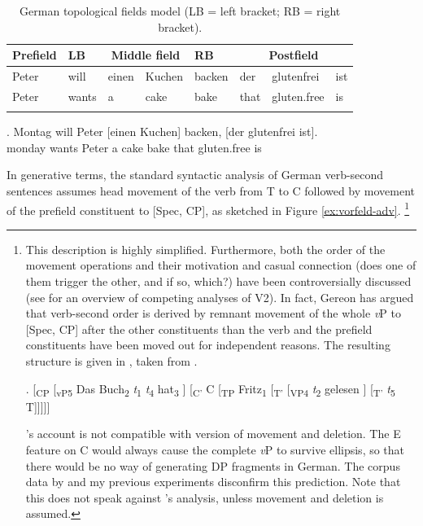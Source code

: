 \begin{table}[t]
\begin{tabular}{l l l l l l l l}
\lsptoprule
Prefield & LB & \multicolumn{2}{c}{Middle field} & RB & \multicolumn{3}{c}{Postfield}  \\   
\midrule
Peter & will & einen & Kuchen & backen & der & glutenfrei & ist\\
Peter & wants & a & cake & bake & that & gluten.free & is\\
\lspbottomrule
\end{tabular}
\caption{German topological fields model (LB = left bracket; RB = right bracket).\label{tab:feldermodell}}
\end{table}

\exg. Montag will Peter [einen Kuchen] backen, [der glutenfrei ist].\\
monday wants Peter a cake bake that gluten.free is\\

\newpage
\noindent In generative terms, the standard syntactic analysis of German verb-second sentences assumes head movement of the verb from T to C followed by movement of the prefield constituent to [Spec, CP], as sketched in Figure \ref{ex:vorfeld-adv}.\largerpage[2]%
%
\footnote{This description is highly simplified. Furthermore, both the order of the movement operations and their motivation and casual connection (does one of them trigger the other, and if so, which?) have been controversially discussed (see \citet{brandner2004} for an overview of competing analyses of V2). In fact, Gereon \citet{muller2004} has argued that verb-second order is derived by remnant movement of the whole \textit{v}P to [Spec, CP] after the other constituents than the verb and the prefield constituents have been moved out for independent reasons. The resulting structure is given in \Next, taken from \citep[181]{muller2004}.

\ex. [\textsubscript{CP} [\textsubscript{vP}\textsubscript{5} Das Buch\textsubscript{2} \textit{t}\textsubscript{1} \textit{t}\textsubscript{4} hat\textsubscript{3} ] [\textsubscript{C'} C [\textsubscript{TP} Fritz\textsubscript{1} [\textsubscript{T'} [\textsubscript{VP}\textsubscript{4} \textit{t}\textsubscript{2} gelesen ] [\textsubscript{T'} \textit{t}\textsubscript{5} T]]]]]

\citeauthor{muller2004}'s account is not compatible with  version of movement and deletion. The E feature on C would always cause the complete \textit{v}P to survive ellipsis, so that there would be no way of generating DP fragments in German. The corpus data by \citet{reich2017} and my previous experiments disconfirm this prediction. Note that this does not speak against \citeauthor{muller2004}'s analysis, unless movement and deletion is assumed.}\afterfn%
%

